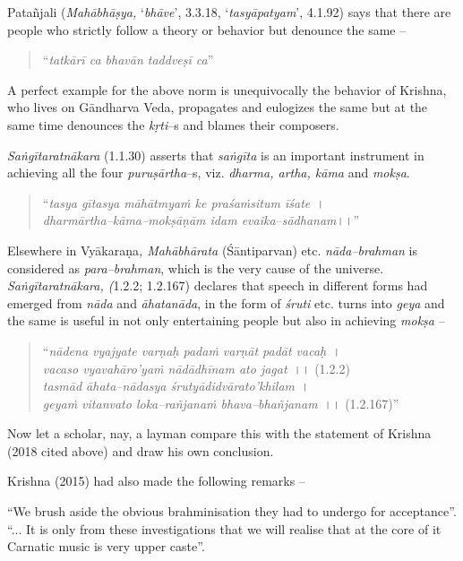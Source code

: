Patañjali (\textit{Mahābhāṣya,} ‘\textit{bhāve}’, 3.3.18, ‘\textit{tasyāpatyam}’, 4.1.92) says that there are people who strictly follow a theory or behavior but denounce the same –

\begin{verse}
“\textit{tatkārī ca bhavān taddveṣī ca}”
\end{verse}

A perfect example for the above norm is unequivocally the behavior of Krishna, who lives on Gāndharva Veda, propagates and eulogizes the same but at the same time denounces the \textit{kṛti}–s and blames their composers. 

\textit{Saṅgītaratnākara} (1.1.30) asserts that \textit{saṅgīta} is an important instrument in achieving all the four \textit{puruṣārtha}–s, viz. \textit{dharma, artha, kāma} and \textit{mokṣa}.

\begin{verse}
“\textit{tasya gītasya māhātmyaṁ ke praśaṁsitum īśate}~।\\\textit{dharmārtha–kāma–mokṣāṇām idam evaika–sādhanam}।।”
\end{verse}

Elsewhere in Vyākaraṇa\textit{, Mahābhārata} (Śāntiparvan) etc. \textit{nāda–brahman} is considered as \textit{para–brahman}, which is the very cause of the universe. \textit{Saṅgītaratnākara, (}1.2.2; 1.2.167) declares that speech in different forms had emerged from \textit{nāda} and \textit{āhatanāda}, in the form of \textit{śruti} etc. turns into \textit{geya} and the same is useful in not only entertaining people but also in achieving \textit{mokṣa} –

\begin{verse}
“\textit{nādena vyajyate varṇaḥ padaṁ varṇāt padāt vacaḥ}~।\\\textit{vacaso vyavahāro’yaṁ nādādhīnam ato jagat}~।। (1.2.2)\\\textit{tasmād āhata–nādasya śrutyādidvārato’khilam}~।\\\textit{geyaṁ vitanvato loka–rañjanaṁ bhava–bhañjanam}~।। (1.2.167)”
\end{verse}

Now let a scholar, nay, a layman compare this with the statement of Krishna (2018 cited above) and draw his own conclusion.

Krishna (2015) had also made the following remarks –  

\begin{myquote}
“We brush aside the obvious brahminisation they had to undergo for acceptance”. “... It is only from these investigations that we will realise that at the core of it Carnatic music is very upper caste”.
\end{myquote}

